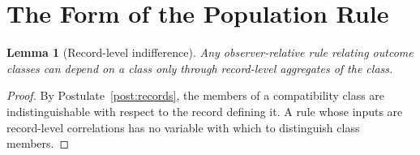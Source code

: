 \documentclass[11pt]{article}
\newtheorem{lemma}{Lemma}
\theoremstyle{definition}
\theoremstyle{remark}
\begin{document}
\section{The Form of the Population Rule}\label{sec:power}

\begin{lemma}[Record-level indifference]\label{lem:indiff}
Any observer-relative rule relating outcome classes can depend on a class only through record-level aggregates of the class.
\end{lemma}
\begin{proof}
By Postulate~\ref{post:records}, the members of a compatibility class are indistinguishable with respect to the record defining it. A rule whose inputs are record-level correlations has no variable with which to distinguish class members.
\end{proof}
\end{document}
